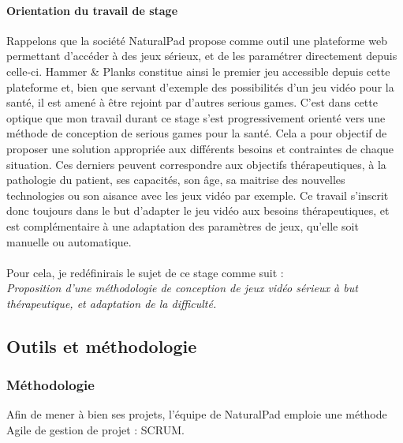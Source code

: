 	\paragraph{Orientation du travail de stage \\}
Rappelons que la société NaturalPad propose comme outil une plateforme web permettant d'accéder à des jeux sérieux, et de les paramétrer directement depuis celle-ci. Hammer \& Planks constitue ainsi le premier jeu accessible depuis cette plateforme et, bien que servant d'exemple des possibilités d'un jeu vidéo pour la santé, il est amené à être rejoint par d'autres serious games. C'est dans cette optique que mon travail durant ce stage s'est progressivement orienté vers une méthode de conception de serious games pour la santé. Cela a pour objectif de proposer une solution appropriée aux différents besoins et contraintes de chaque situation. Ces derniers peuvent correspondre aux objectifs thérapeutiques, à la pathologie du patient, ses capacités, son âge, sa maitrise des nouvelles technologies ou son aisance avec les jeux vidéo par exemple.
Ce travail s'inscrit donc toujours dans le but d'adapter le jeu vidéo aux besoins thérapeutiques, et est complémentaire à une adaptation des paramètres de jeux, qu'elle soit manuelle ou automatique.
 
\paragraph{}Pour cela, je redéfinirais le sujet de ce stage comme suit :\\
\textcolor{marron}{\emph{ {\large Proposition d'une méthodologie de conception de jeux vidéo sérieux à but thérapeutique, et adaptation de la difficulté.}}}

\subsection{Outils et méthodologie}
	\subsubsection{Méthodologie}
Afin de mener à bien ses projets, l’équipe de NaturalPad emploie une méthode Agile de gestion de projet : SCRUM.

